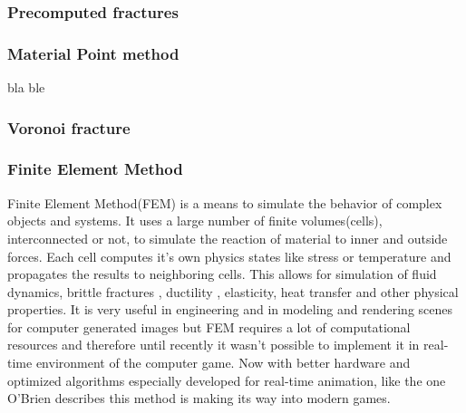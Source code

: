 \subsubsection{Precomputed fractures}



\subsubsection{Material Point method}
bla \cite{GIMPM}
ble \cite{jiang2015material}

\subsubsection{Voronoi fracture}

\subsubsection{Finite Element Method}
Finite Element Method(FEM) is a means to simulate the behavior of complex objects and systems.  It uses a large number of finite volumes(cells), interconnected or not, to simulate the reaction of material to inner and outside forces. Each cell computes it's own physics states like stress or temperature and propagates the results to neighboring cells. This allows for simulation of fluid dynamics, brittle fractures \cite{brittlefracture}, ductility \cite{ductilefracture}, elasticity, heat transfer and other physical properties. It is very useful in engineering and in modeling and rendering scenes for computer generated images but FEM requires a lot of computational resources and therefore until recently it wasn't possible to implement it in real-time environment of the computer game. Now with better hardware and optimized algorithms especially developed for real-time animation, like the one O'Brien \cite{femingames} describes this method is making its way into modern games.




